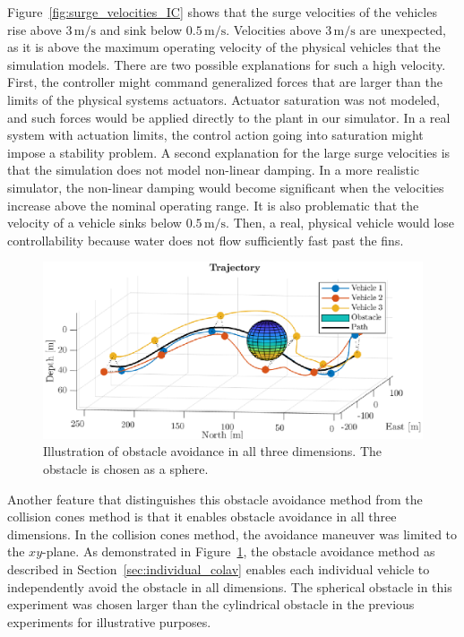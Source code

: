 Figure~\ref{fig:surge_velocities_IC} shows that the surge velocities of the vehicles rise above $3\, \mathrm{m/s}$ and sink below $0.5\, \mathrm{m/s}$. Velocities above $3\, \mathrm{m/s}$ are unexpected, as it is above the maximum operating velocity of the physical vehicles that the simulation models. There are two possible explanations for such a high velocity. First, the controller might command generalized forces that are larger than the limits of the physical systems actuators. Actuator saturation was not modeled, and such forces would be applied directly to the plant in our simulator. In a real system with actuation limits, the control action going into saturation might impose a stability problem. A second explanation for the large surge velocities is that the simulation does not model non-linear damping. In a more realistic simulator, the non-linear damping would become significant when the velocities increase above the nominal operating range. It is also problematic that the velocity of a vehicle sinks below $0.5\, \mathrm{m/s}$. Then, a real, physical vehicle would lose controllability because water does not flow sufficiently fast past the fins.

\begin{figure}[htb]
    \centering
    \includegraphics[width=.9\textwidth]{figures/plot3d_sphere.eps}
    \vspace{-3mm}
    \caption{Illustration of obstacle avoidance in all three dimensions. The obstacle is chosen as a sphere.}
    \label{fig:sphere_avoidance}
    \vspace{-4mm}
\end{figure}

Another feature that distinguishes this obstacle avoidance method from the collision cones method is that it enables obstacle avoidance in all three dimensions. In the collision cones method, the avoidance maneuver was limited to the $xy$-plane. As demonstrated in Figure~\ref{fig:sphere_avoidance}, the obstacle avoidance method as described in Section~\ref{sec:individual_colav} enables each individual vehicle to independently avoid the obstacle in all dimensions. The spherical obstacle in this experiment was chosen larger than the cylindrical obstacle in the previous experiments for illustrative purposes.

